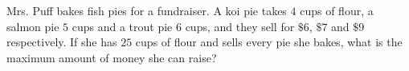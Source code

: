 Mrs. Puff bakes fish pies for a fundraiser. A koi pie takes $4$ cups of flour, a salmon pie $5$ cups and a trout pie $6$ cups, and they sell for $\$6$, $\$7$ and $\$9$ respectively. If she has $25$ cups of flour and sells every pie she bakes, what is the maximum amount of money she can raise?
